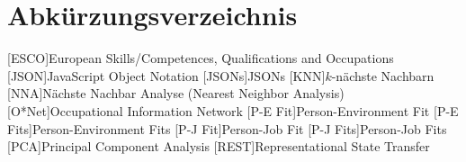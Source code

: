 \renewcommand{\chaptermark}[1]{\markboth{\spacedlowsmallcaps{#1}}{\spacedlowsmallcaps{#1}}}
\renewcommand{\sectionmark}[1]{\markright{\thesection\enspace\spacedlowsmallcaps{#1}}}
\chapter*{Abk\"{u}rzungsverzeichnis}

\begin{acronym}[AWGN]%
  [ESCO]{European Skills/Competences, Qualifications and Occupations}
  [JSON]{JavaScript Object Notation}
  [JSONs]{JSONs}
  [KNN]{$k$-nächste Nachbarn}
  [NNA]{Nächste Nachbar Analyse (Nearest Neighbor Analysis)}
  [O*Net]{Occupational Information Network}
  [P-E Fit]{Person-Environment Fit}
  [P-E Fits]{Person-Environment Fits}
  [P-J Fit]{Person-Job Fit}
  [P-J Fits]{Person-Job Fits}
  [PCA]{Principal Component Analysis}
  [REST]{Representational State Transfer}
\end{acronym}

\cleardoublepage
